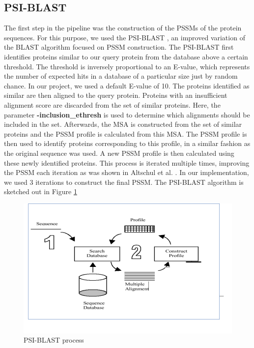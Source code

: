 \subsection{PSI-BLAST}
The first step in the pipeline was the construction of the PSSMs of the protein sequences.
For this purpose, we used the PSI-BLAST \cite{altschul1997gapped}, an improved variation of the BLAST algorithm focused on PSSM construction.
The PSI-BLAST first identifies proteins similar to our query protein from the database above a certain threshold.
The threshold is inversely proportional to an E-value, which represents the number of expected hits in a database of a particular size just by random chance.
In our project, we used a default E-value of 10.
The proteins identified as similar are then aligned to the query protein.
Proteins with an insufficient alignment score are discarded from the set of similar proteins.
Here, the parameter \textbf{-inclusion\_ethresh} is used to determine which alignments should be included in the set. 
Afterwards, the MSA is constructed from the set of similar proteins and the PSSM profile is calculated from this MSA.
The PSSM profile is then used to identify proteins corresponding to this profile, in a similar fashion as the original sequence was used.
A new PSSM profile is then calculated using these newly identified proteins.
This process is iterated multiple times, improving the PSSM each iteration as was shown in Altschul et al. \cite{altschul1997gapped}.
In our implementation, we used 3 iterations to construct the final PSSM. 
The PSI-BLAST algorithm is sketched out in Figure \ref{fig:psi_blast}
\begin{figure}
    \centering
    \includegraphics[width=\linewidth]{imgs_andy/psi_blast.png}
    \caption{PSI-BLAST process}
    \label{fig:psi_blast}
\end{figure}

